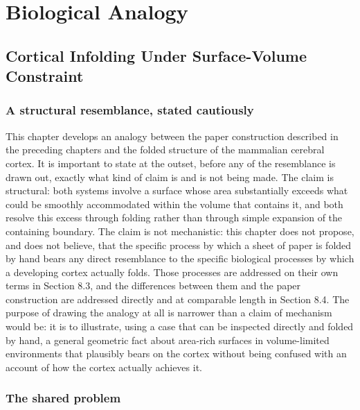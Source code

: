 \documentclass[11pt,oneside]{book}
\begin{document}
\part{Biological Analogy}

\hypertarget{chapter-8.-cortical-infolding-under-surface-volume-constraint}{%
\chapter{Cortical Infolding Under Surface-Volume
Constraint}\label{chapter-8.-cortical-infolding-under-surface-volume-constraint}}

\hypertarget{a-structural-resemblance-stated-cautiously}{%
\section{A structural resemblance, stated
cautiously}\label{a-structural-resemblance-stated-cautiously}}

This chapter develops an analogy between the paper construction
described in the preceding chapters and the folded structure of the
mammalian cerebral cortex. It is important to state at the outset,
before any of the resemblance is drawn out, exactly what kind of claim
is and is not being made. The claim is structural: both systems involve
a surface whose area substantially exceeds what could be smoothly
accommodated within the volume that contains it, and both resolve this
excess through folding rather than through simple expansion of the
containing boundary. The claim is not mechanistic: this chapter does not
propose, and does not believe, that the specific process by which a
sheet of paper is folded by hand bears any direct resemblance to the
specific biological processes by which a developing cortex actually
folds. Those processes are addressed on their own terms in Section 8.3,
and the differences between them and the paper construction are
addressed directly and at comparable length in Section 8.4. The purpose
of drawing the analogy at all is narrower than a claim of mechanism
would be: it is to illustrate, using a case that can be inspected
directly and folded by hand, a general geometric fact about area-rich
surfaces in volume-limited environments that plausibly bears on the
cortex without being confused with an account of how the cortex actually
achieves it.

\hypertarget{the-shared-problem}{%
\section{The shared problem}\label{the-shared-problem}}
\end{document}
